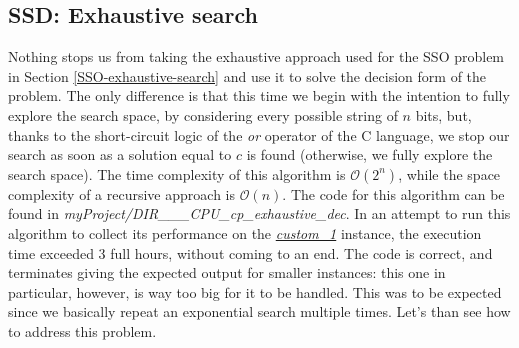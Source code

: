 \documentclass[12pt]{extarticle}
\begin{document}
\subsection{SSD: Exhaustive search}
Nothing stops us from taking the exhaustive approach used for the SSO problem in Section \ref{SSO-exhaustive-search} and use it to solve the decision form of the problem. The only difference is that this time we begin with the intention to fully explore the search space, by considering every possible string of $n$ bits, but, thanks to the short-circuit logic of the \emph{or} operator of the C language, we stop our search as soon as a solution equal to $c$ is found (otherwise, we fully explore the search space).\newline
The time complexity of this algorithm is $\mathcal{O}(2^{n})$, while the space complexity of a recursive approach is $\mathcal{O}(n)$.\newline
The code for this algorithm can be found in \emph{myProject/DIR\_\_\_CPU\_cp\_exhaustive\_dec}.\newline
In an attempt to run this algorithm to collect its performance on the 
\hyperref[custom-1]{\emph{custom\_1}} instance, the execution time exceeded 3 full hours, without coming to an end. The code is correct, and terminates giving the expected output for smaller instances: this one in particular, however, is way too big for it to be handled. This was to be expected since we basically repeat an exponential search multiple times. Let's than see how to address this problem.
\end{document}
